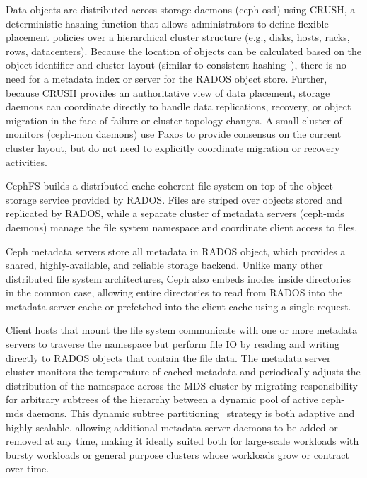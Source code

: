 Data objects are distributed across storage daemons (ceph-osd) using
CRUSH\cite{Weil:2006:Crush}, a deterministic hashing function that allows
administrators to define flexible placement policies over a hierarchical
cluster structure (e.g., disks, hosts, racks, rows, datacenters).  Because the
location of objects can be calculated based on the object identifier and
cluster layout (similar to consistent hashing~\cite{karger1997consistent}),
there is no need for a metadata index or server for the RADOS object store.
Further, because CRUSH provides an authoritative view of data placement,
storage daemons can coordinate directly to handle data replications, recovery,
or object migration in the face of failure or cluster topology changes.  A
small cluster of monitors (ceph-mon daemons) use Paxos to provide consensus on
the current cluster layout, but do not need to explicitly coordinate migration
or recovery activities.

CephFS builds a distributed cache-coherent file system on top of the object
storage service provided by RADOS.  Files are striped over objects stored and
replicated by RADOS, while a separate cluster of metadata servers (ceph-mds
daemons) manage the file system namespace and coordinate client access to
files.  

Ceph metadata servers store all metadata in RADOS object, which provides a
shared, highly-available, and reliable storage backend.  Unlike many other
distributed file system architectures, Ceph also embeds inodes inside
directories in the common case, allowing entire directories to read from RADOS
into the metadata server cache or prefetched into the client cache using a
single request.

Client hosts that mount the file system communicate with one or more metadata
servers to traverse the namespace but perform file IO by reading and writing
directly to RADOS objects that contain the file data.  The metadata server
cluster monitors the temperature of cached metadata and periodically adjusts
the distribution of the namespace across the MDS cluster by migrating
responsibility for arbitrary subtrees of the hierarchy between a dynamic pool
of active ceph-mds daemons.  This dynamic subtree
partitioning~\cite{Weil:2004:dynamic} strategy is both adaptive and highly
scalable, allowing additional metadata server daemons to be added or removed
at any time, making it ideally suited both for large-scale workloads with
bursty workloads or general purpose clusters whose workloads grow or contract
over time.

